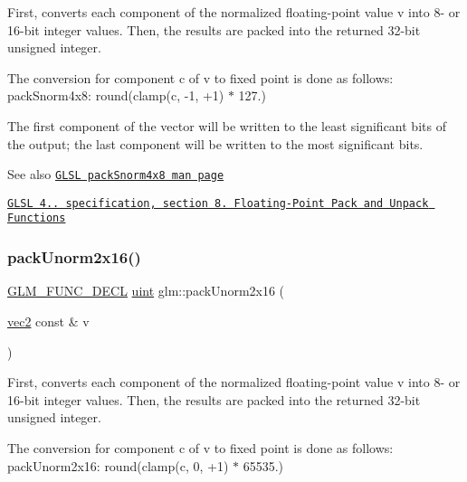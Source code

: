 First, converts each component of the normalized floating-\/point value v into 8-\/ or 16-\/bit integer values. Then, the results are packed into the returned 32-\/bit unsigned integer.

The conversion for component c of v to fixed point is done as follows\+: pack\+Snorm4x8\+: round(clamp(c, -\/1, +1) $\ast$ 127.)

The first component of the vector will be written to the least significant bits of the output; the last component will be written to the most significant bits.

\begin{DoxySeeAlso}{See also}
\href{http://www.opengl.org/sdk/docs/manglsl/xhtml/packSnorm4x8.xml}{\tt G\+L\+SL pack\+Snorm4x8 man page} 

\href{http://www.opengl.org/registry/doc/GLSLangSpec.4.20.8.pdf}{\tt G\+L\+SL 4.. specification, section 8. Floating-\/\+Point Pack and Unpack Functions} 
\end{DoxySeeAlso}
\mbox{\label{group__core__func__packing_ga0e2d107039fe608a209497af867b85fb}} 
\subsubsection{\texorpdfstring{pack\+Unorm2x16()}{packUnorm2x16()}}
{\footnotesize\ttfamily \hyperlink{setup_8hpp_ab2d052de21a70539923e9bcbf6e83a51}{G\+L\+M\+\_\+\+F\+U\+N\+C\+\_\+\+D\+E\+CL} \hyperlink{group__core__precision_ga4fd29415871152bfb5abd588334147c8}{uint} glm\+::pack\+Unorm2x16 (\begin{DoxyParamCaption}\item[{\hyperlink{group__core__types_gaa1618f51db67eaa145db101d8c8431d8}{vec2} const \&}]{v }\end{DoxyParamCaption})}

First, converts each component of the normalized floating-\/point value v into 8-\/ or 16-\/bit integer values. Then, the results are packed into the returned 32-\/bit unsigned integer.

The conversion for component c of v to fixed point is done as follows\+: pack\+Unorm2x16\+: round(clamp(c, 0, +1) $\ast$ 65535.)

